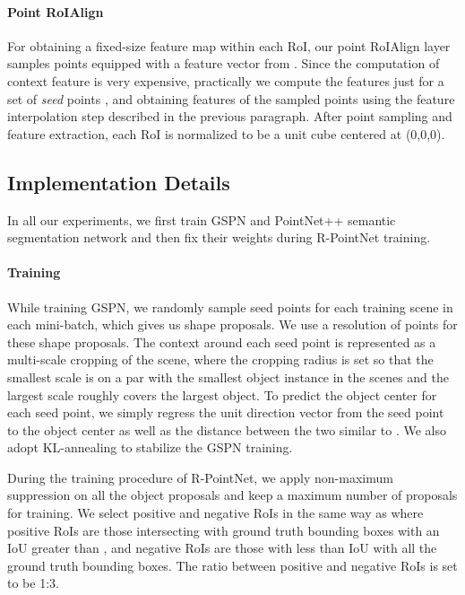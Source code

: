 \documentclass[10pt,twocolumn,letterpaper]{article}
\begin{document}
\vspace{-\baselineskip}
\paragraph{Point RoIAlign}
For obtaining a fixed-size feature map within each RoI, our point RoIAlign layer samples  points equipped with a feature vector from . Since the computation of context feature  is very expensive, practically we compute the features just for a set of \emph{seed} points , and obtaining features of the sampled points using the feature interpolation step described in the previous paragraph. After point sampling and feature extraction, each RoI is normalized to be a unit cube centered at (0,0,0).

\subsection{Implementation Details}
In all our experiments, we first train GSPN and PointNet++ semantic segmentation network and then fix their weights during R-PointNet training.

\vspace{-\baselineskip}
\paragraph{Training}
While training GSPN, we randomly sample  seed points for each training scene in each mini-batch, which gives us  shape proposals. We use a resolution of  points for these shape proposals. The context around each seed point is represented as a multi-scale cropping of the scene, where the cropping radius is set so that the smallest scale is on a par with the smallest object instance in the scenes and the largest scale roughly covers the largest object. To predict the object center for each seed point, we simply regress the unit direction vector from the seed point to the object center as well as the distance between the two similar to \cite{xiang2017posecnn}. We also adopt KL-annealing \cite{bowman2015generating} to stabilize the GSPN training.

During the training procedure of R-PointNet, we apply non-maximum suppression \cite{girshick2015deformable} on all the object proposals and keep a maximum number of  proposals for training. We select positive and negative RoIs in the same way as \cite{he2017mask} where positive RoIs are those intersecting with ground truth bounding boxes with an IoU greater than , and negative RoIs are those with less than  IoU with all the ground truth bounding boxes. The ratio between positive and negative RoIs is set to be 1:3.
\end{document}

